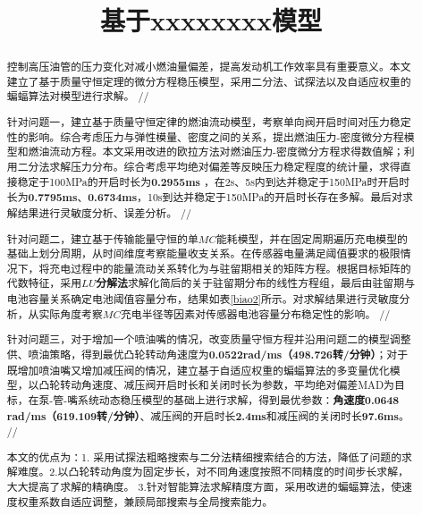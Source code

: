 \documentclass{whutmod}
\title{基于xxxxxxxx模型}
\begin{document}
	\maketitle
	\thispagestyle{empty}
	\begin{abstract}
		控制高压油管的压力变化对减小燃油量偏差，提高发动机工作效率具有重要意义。本文建立了基于质量守恒定理的微分方程稳压模型，采用二分法、试探法以及自适应权重的蝙蝠算法对模型进行求解。
		//
	
		针对问题一，建立基于质量守恒定律的燃油流动模型，考察单向阀开启时间对压力稳定性的影响。综合考虑压力与弹性模量、密度之间的关系，提出燃油压力-密度微分方程模型和燃油流动方程。本文采用改进的欧拉方法对燃油压力-密度微分方程求得数值解；利用二分法求解压力分布。综合考虑平均绝对偏差等反映压力稳定程度的统计量，求得直接稳定于100MPa的开启时长为\textbf{0.2955ms} ，在2s、5s内到达并稳定于150MPa时开启时长为\textbf{0.7795ms}、\textbf{0.6734ms}，10s到达并稳定于150MPa的开启时长存在多解。最后对求解结果进行灵敏度分析、误差分析。
		//
		
		针对问题二，建立基于传输能量守恒的单$MC$能耗模型，并在固定周期遍历充电模型的基础上划分周期，从时间维度考察能量收支关系。在传感器电量满足阈值要求的极限情况下，将充电过程中的能量流动关系转化为与驻留期相关的矩阵方程。根据目标矩阵的代数特征，采用\textbf{$LU$分解法}求解化简后的关于驻留期分布的线性方程组，最后由驻留期与电池容量关系确定电池阈值容量分布，结果如表\ref{biao2}所示。对求解结果进行灵敏度分析，从实际角度考察$MC$充电半径等因素对传感器电池容量分布稳定性的影响。
		//
	
		针对问题三，对于增加一个喷油嘴的情况，改变质量守恒方程并沿用问题二的模型调整供、喷油策略，得到最优凸轮转动角速度为\textbf{0.0522rad/ms（498.726转/分钟）}；对于既增加喷油嘴又增加减压阀的情况，建立基于自适应权重的蝙蝠算法的多变量优化模型，以凸轮转动角速度、减压阀开启时长和关闭时长为参数，平均绝对偏差MAD为目标，在泵-管-嘴系统动态稳压模型的基础上进行求解，得到最优参数：\textbf{角速度0.0648 rad/ms（619.109转/分钟）}、减压阀的开启时长\textbf{2.4ms}和减压阀的关闭时长\textbf{97.6ms}。
		//
	
		本文的优点为：1. 采用试探法粗略搜索与二分法精细搜索结合的方法，降低了问题的求解难度。2.以凸轮转动角度为固定步长，对不同角速度按照不同精度的时间步长求解，大大提高了求解的精确度。 3.针对智能算法求解精度方面，采用改进的蝙蝠算法，使速度权重系数自适应调整，兼顾局部搜索与全局搜索能力。
		
	\end{abstract}
\end{document}
